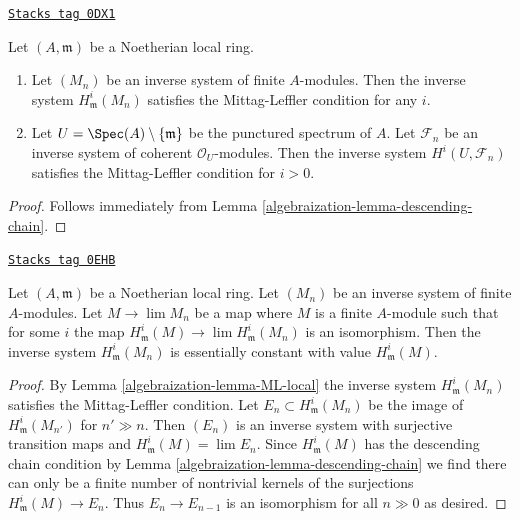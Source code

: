 \begin{lemma}[ML local]
\label{algebraization-lemma-ML-local}
\href{https://stacks.math.columbia.edu/tag/0DX1}{\texttt{Stacks tag 0DX1}}

Let $(A, \mathfrak m)$ be a Noetherian local ring.
\begin{enumerate}
\item Let $(M_n)$ be an inverse system of finite $A$-modules. Then the
inverse system $H^i_\mathfrak m(M_n)$ satisfies the Mittag-Leffler
condition for any $i$.
\item Let $U = \Spec(A) \setminus \{\mathfrak m\}$ be the
punctured spectrum of $A$.
Let $\mathcal{F}_n$ be an inverse system of
coherent $\mathcal{O}_U$-modules.
Then the inverse system $H^i(U, \mathcal{F}_n)$
satisfies the Mittag-Leffler condition for $i > 0$.
\end{enumerate}
\end{lemma}

\begin{proof}

Follows immediately from Lemma \ref{algebraization-lemma-descending-chain}.
\end{proof}

\begin{lemma}[Terrific]
\label{algebraization-lemma-terrific}
\href{https://stacks.math.columbia.edu/tag/0EHB}{\texttt{Stacks tag 0EHB}}

Let $(A, \mathfrak m)$ be a Noetherian local ring.
Let $(M_n)$ be an inverse system of finite $A$-modules.
Let $M \to \lim M_n$ be a map where $M$ is a finite $A$-module
such that for some $i$ the map
$H^i_\mathfrak m(M) \to \lim H^i_\mathfrak m(M_n)$
is an isomorphism.
Then the inverse system $H^i_\mathfrak m(M_n)$
is essentially constant with value $H^i_\mathfrak m(M)$.
\end{lemma}

\begin{proof}

By Lemma \ref{algebraization-lemma-ML-local} the inverse system $H^i_\mathfrak m(M_n)$
satisfies the Mittag-Leffler condition. Let $E_n \subset H^i_\mathfrak m(M_n)$
be the image of $H^i_\mathfrak m(M_{n'})$ for $n' \gg n$.
Then $(E_n)$ is an inverse system with surjective transition maps
and $H^i_\mathfrak m(M) = \lim E_n$. Since $H^i_\mathfrak m(M)$
has the descending chain condition by
Lemma \ref{algebraization-lemma-descending-chain}
we find there can only be a finite number of nontrivial
kernels of the surjections $H^i_\mathfrak m(M) \to E_n$.
Thus $E_n \to E_{n - 1}$ is an isomorphism for all $n \gg 0$
as desired.
\end{proof}

